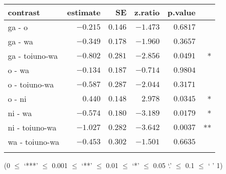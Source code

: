\begin{table}

 \label{Par:PersistencePar:LSMEANST}
 \begin{tabularx}{\textwidth}{Xrrrrr}
 \lsptoprule
 contrast      &    estimate &        SE & z.ratio & p.value & \\
 \midrule
 ga - o         &  $-0.215$ & $0.146$ & $-1.473$ & $0.6817$ & \\
 ga - wa        &  $-0.349$ & $0.178$ & $-1.960$ & $0.3657$ & \\
 ga - toiuno-wa &  $-0.802$ & $0.281$ & $-2.856$ & $0.0491$ & * \\
 o - wa         &  $-0.134$ & $0.187$ & $-0.714$ & $0.9804$ & \\
 o - toiuno-wa  &  $-0.587$ & $0.287$ & $-2.044$ & $0.3171$ & \\
 o - ni         &  $ 0.440$ & $0.148$ & $ 2.978$ & $0.0345$ & * \\
 ni - wa        &  $-0.574$ & $0.180$ & $-3.189$ & $0.0179$ & * \\
 ni - toiuno-wa &  $-1.027$ & $0.282$ & $-3.642$ & $0.0037$ & ** \\
 wa - toiuno-wa &  $-0.453$ & $0.302$ & $-1.501$ & $0.6635$ & \\
 \lspbottomrule
 \end{tabularx}

 \hfill{(0 $\le$ `***' $\le$ 0.001 $\le$ `**' $\le$ 0.01 $\le$ `*' $\le$ 0.05 `.' $\le$ 0.1 $\le$ ` ' 1)}
\end{table}

